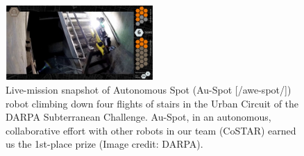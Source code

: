 \documentclass[letterpaper, 10pt, conference]{ieeeconf}      %
\newcommand{\rev}[1]{{\color{blue}#1}} %
\begin{document}


\begin{figure}[t!]
  \centering
  \includegraphics[width=0.5\textwidth]{graphics/spot_cover_ver1.jpg}
  \caption{%
  \rev{Live-mission snapshot of Autonomous Spot} (Au-Spot [/awe-spot/]) robot climbing down four flights of stairs in the Urban Circuit of the DARPA Subterranean Challenge. Au-Spot, in an autonomous, collaborative effort with other robots in our team (CoSTAR) \rev{earned us} the 1st-place prize (Image credit: DARPA).} %
  
  
  \label{fig:stairs-firstPage}
\end{figure}
\end{document}
